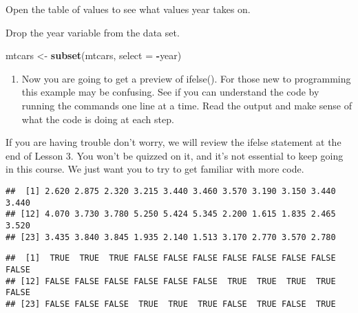 \documentclass[]{article}
\newenvironment{Shaded}{\begin{snugshade}}{\end{snugshade}}
\newcommand{\KeywordTok}[1]{\textcolor[rgb]{0.13,0.29,0.53}{\textbf{#1}}}
\newcommand{\DataTypeTok}[1]{\textcolor[rgb]{0.13,0.29,0.53}{#1}}
\newcommand{\DecValTok}[1]{\textcolor[rgb]{0.00,0.00,0.81}{#1}}
\newcommand{\StringTok}[1]{\textcolor[rgb]{0.31,0.60,0.02}{#1}}
\newcommand{\OperatorTok}[1]{\textcolor[rgb]{0.81,0.36,0.00}{\textbf{#1}}}
\newcommand{\NormalTok}[1]{#1}
\providecommand{\tightlist}{%
  \setlength{\itemsep}{0pt}\setlength{\parskip}{0pt}}
\begin{document}
Open the table of values to see what values year takes on.

Drop the year variable from the data set.

\begin{Shaded}
\begin{Highlighting}[]
\NormalTok{mtcars <-}\StringTok{ }\KeywordTok{subset}\NormalTok{(mtcars, }\DataTypeTok{select =} \OperatorTok{-}\NormalTok{year)}
\end{Highlighting}
\end{Shaded}

\begin{enumerate}
\def\labelenumi{\arabic{enumi}.}
\setcounter{enumi}{9}
\tightlist
\item
  Now you are going to get a preview of ifelse(). For those new to
  programming this example may be confusing. See if you can understand
  the code by running the commands one line at a time. Read the output
  and make sense of what the code is doing at each step.
\end{enumerate}

If you are having trouble don't worry, we will review the ifelse
statement at the end of Lesson 3. You won't be quizzed on it, and it's
not essential to keep going in this course. We just want you to try to
get familiar with more code.

\begin{Shaded}
\end{Shaded}

\begin{verbatim}
##  [1] 2.620 2.875 2.320 3.215 3.440 3.460 3.570 3.190 3.150 3.440 3.440
## [12] 4.070 3.730 3.780 5.250 5.424 5.345 2.200 1.615 1.835 2.465 3.520
## [23] 3.435 3.840 3.845 1.935 2.140 1.513 3.170 2.770 3.570 2.780
\end{verbatim}

\begin{Shaded}
\end{Shaded}

\begin{verbatim}
##  [1]  TRUE  TRUE  TRUE FALSE FALSE FALSE FALSE FALSE FALSE FALSE FALSE
## [12] FALSE FALSE FALSE FALSE FALSE FALSE  TRUE  TRUE  TRUE  TRUE FALSE
## [23] FALSE FALSE FALSE  TRUE  TRUE  TRUE FALSE  TRUE FALSE  TRUE
\end{verbatim}
\end{document}
